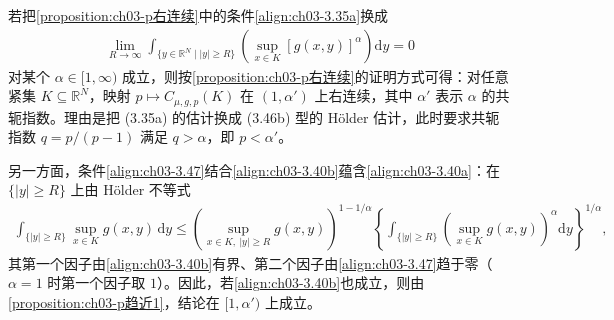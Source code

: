 \documentclass[../../main.tex]{subfiles}%
\begin{document}
\begin{remark}\label{remark:ch03-条件替换}
若把\cref{proposition:ch03-p右连续}中的条件\eqref{align:ch03-3.35a}换成
\begin{align}
\lim_{R\to\infty}\int_{\{y\in\mathbb{R}^N\mid|y|\geqslant R\}}\left(\sup_{x\in K}[g(x,y)]^\alpha\right)\mathrm{d}y=0\label{align:ch03-3.47}
\end{align}
对某个 $\alpha\in[1,\infty)$ 成立，则按\cref{proposition:ch03-p右连续}的证明方式可得：对任意紧集 $K\subseteq\mathbb{R}^N$，映射 $p\mapsto C_{\mu,g,p}(K)$ 在 $(1,\alpha')$ 上右连续，其中 $\alpha'$ 表示 $\alpha$ 的共轭指数。理由是把 (3.35a) 的估计换成 (3.46b) 型的 Hölder 估计，此时要求共轭指数 $q=p/(p-1)$ 满足 $q>\alpha$，即 $p<\alpha'$。

另一方面，条件\eqref{align:ch03-3.47}结合\eqref{align:ch03-3.40b}蕴含\eqref{align:ch03-3.40a}：在 $\{|y|\geqslant R\}$ 上由 Hölder 不等式
\begin{align*}
\int_{\{|y|\geqslant R\}}\sup_{x\in K}g(x,y)\,\mathrm{d}y
\leqslant\left(\sup_{x\in K,\ |y|\geqslant R}g(x,y)\right)^{1-1/\alpha}
\left\{\int_{\{|y|\geqslant R\}}\left(\sup_{x\in K}g(x,y)\right)^\alpha\mathrm{d}y\right\}^{1/\alpha},
\end{align*}
其第一个因子由\eqref{align:ch03-3.40b}有界、第二个因子由\eqref{align:ch03-3.47}趋于零（$\alpha=1$ 时第一个因子取 $1$）。因此，若\eqref{align:ch03-3.40b}也成立，则由\cref{proposition:ch03-p趋近1}，结论在 $[1,\alpha')$ 上成立。
\end{remark}
\end{document}
